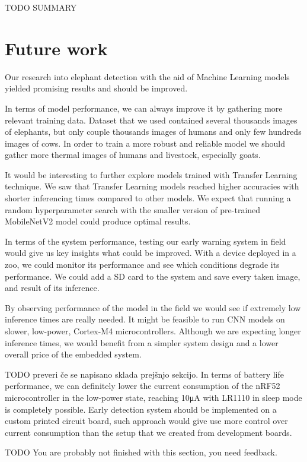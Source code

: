 TODO SUMMARY



\section{Future work}

Our research into elephant detection with the aid of Machine Learning models yielded promising results and should be improved.

In terms of model performance, we can always improve it by gathering more relevant training data.
Dataset that we used contained several thousands images of elephants, but only couple thousands images of humans and only few hundreds images of cows.
In order to train a more robust and reliable model we should gather more thermal images of humans and livestock, especially goats.

It would be interesting to further explore models trained with Transfer Learning technique.
We saw that Transfer Learning models reached higher accuracies with shorter inferencing times compared to other models.
We expect that running a random hyperparameter search with the smaller version of pre-trained MobileNetV2 model could produce optimal results.

In terms of the system performance, testing our early warning system in field would give us key insights what could be improved.
With a device deployed in a zoo, we could monitor its performance and see which conditions degrade its performance.
We could add a SD card to the system and save every taken image, and result of its inference.

By observing performance of the model in the field we would see if extremely low inference times are really needed.
It might be feasible to run CNN models on slower, low-power, Cortex-M4 microcontrollers.
Although we are expecting longer inference times, we would benefit from a simpler system design and a lower overall price of the embedded system.

TODO preveri če se napisano sklada prejšnjo sekcijo.
In terms of battery life performance, we can definitely lower the current consumption of the nRF52 microcontroller in the low-power state, reaching 10\si{\micro\ampere} with LR1110 in sleep mode is completely possible.
Early detection system should be implemented on a custom printed circuit board, such approach would give use more control over current consumption than the setup that we created from development boards.

TODO You are probably not finished with this section, you need feedback.


